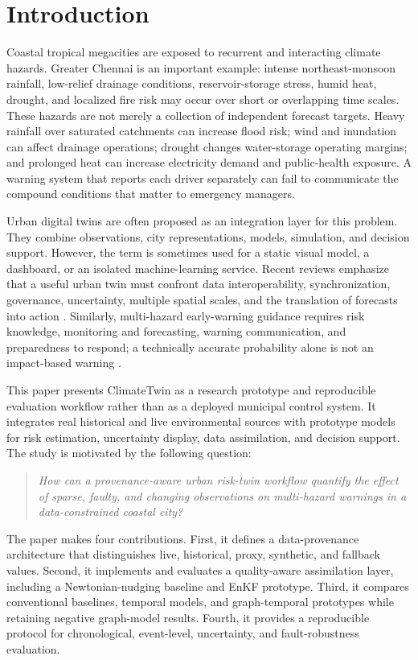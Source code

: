 \documentclass[journal]{IEEEtran}
\begin{document}
\section{Introduction}
Coastal tropical megacities are exposed to recurrent and interacting climate hazards. Greater Chennai is an important example: intense northeast-monsoon rainfall, low-relief drainage conditions, reservoir-storage stress, humid heat, drought, and localized fire risk may occur over short or overlapping time scales. These hazards are not merely a collection of independent forecast targets. Heavy rainfall over saturated catchments can increase flood risk; wind and inundation can affect drainage operations; drought changes water-storage operating margins; and prolonged heat can increase electricity demand and public-health exposure. A warning system that reports each driver separately can fail to communicate the compound conditions that matter to emergency managers.

Urban digital twins are often proposed as an integration layer for this problem. They combine observations, city representations, models, simulation, and decision support. However, the term is sometimes used for a static visual model, a dashboard, or an isolated machine-learning service. Recent reviews emphasize that a useful urban twin must confront data interoperability, synchronization, governance, uncertainty, multiple spatial scales, and the translation of forecasts into action \cite{macatulad2024,zhu2025,omrany2025}. Similarly, multi-hazard early-warning guidance requires risk knowledge, monitoring and forecasting, warning communication, and preparedness to respond; a technically accurate probability alone is not an impact-based warning \cite{undrr2024,wmo2024}.

This paper presents ClimateTwin as a research prototype and reproducible evaluation workflow rather than as a deployed municipal control system. It integrates real historical and live environmental sources with prototype models for risk estimation, uncertainty display, data assimilation, and decision support. The study is motivated by the following question:
\begin{quote}
\emph{How can a provenance-aware urban risk-twin workflow quantify the effect of sparse, faulty, and changing observations on multi-hazard warnings in a data-constrained coastal city?}
\end{quote}

The paper makes four contributions. First, it defines a data-provenance architecture that distinguishes live, historical, proxy, synthetic, and fallback values. Second, it implements and evaluates a quality-aware assimilation layer, including a Newtonian-nudging baseline and EnKF prototype. Third, it compares conventional baselines, temporal models, and graph-temporal prototypes while retaining negative graph-model results. Fourth, it provides a reproducible protocol for chronological, event-level, uncertainty, and fault-robustness evaluation.
\end{document}
